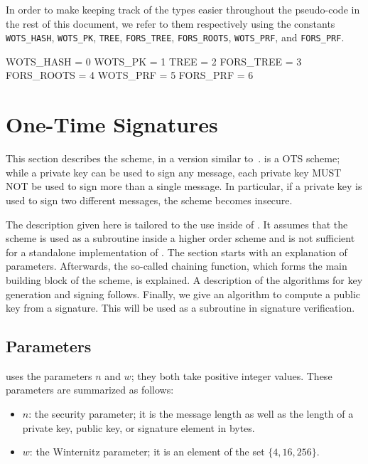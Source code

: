    In order to make keeping track of the types easier throughout the pseudo-code in
   the rest of this document, we refer to them respectively using the constants
   \texttt{WOTS\_HASH}, \texttt{WOTS\_PK}, \texttt{TREE}, \texttt{FORS\_TREE}, \texttt{FORS\_ROOTS}, \texttt{WOTS\_PRF}, and \texttt{FORS\_PRF}.

\begin{code}
  WOTS_HASH  = 0
  WOTS_PK    = 1
  TREE       = 2
  FORS_TREE  = 3
  FORS_ROOTS = 4
  WOTS_PRF   = 5
  FORS_PRF   = 6
\end{code}


\section{\wotsp One-Time Signatures}\label{sec:wots}
This section describes the \wotsp scheme, in a version similar
to~\cite{Hulsing2013}. \wotsp is a OTS scheme; while a private key can be used
to sign any message, each private key MUST NOT be used to sign more than a single
message. In particular, if a private key is used to sign two different messages,
the scheme becomes insecure.

The description given here is tailored to the use inside of \spx. It assumes that
the scheme is used as a subroutine inside a higher order scheme and is not sufficient
for a standalone implementation of \wotsp. The section starts with an explanation
of parameters. Afterwards, the so-called
chaining function, which forms the main building block of the \wotsp scheme, is
explained. A description of the algorithms for key generation and signing follows.
Finally, we give an algorithm to compute a \wotsp public key from a \wotsp
signature. This will be used as a subroutine in \spx signature verification.

\subsection{\wotsp Parameters}\label{sec:wots:params}
\wotsp uses the parameters $n$ and $w$; they both take positive integer values.
These parameters are summarized as follows:
\begin{itemize}
  \item $n$: the security parameter; it is the message length as well as the
  length of a private key, public key, or signature element in bytes.
  \item $w$: the Winternitz parameter; it is an element of the set $\{4, 16, 256\}$.
\end{itemize}

